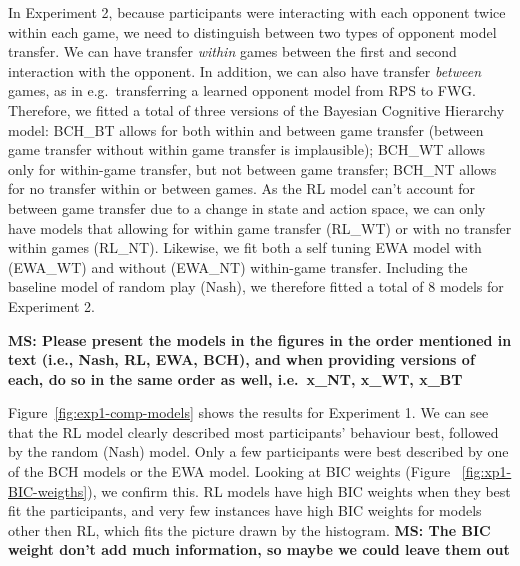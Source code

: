 \documentclass[
  english,
  man,floatsintext]{apa6}
\begin{document}
In Experiment 2, because participants were interacting with each opponent twice within each game, we need to distinguish between two types of opponent model transfer. We can have transfer \emph{within} games between the first and second interaction with the opponent. In addition, we can also have transfer \emph{between} games, as in e.g.~transferring a learned opponent model from RPS to FWG. Therefore, we fitted a total of three versions of the Bayesian Cognitive Hierarchy model: BCH\_BT allows for both within and between game transfer (between game transfer without within game transfer is implausible); BCH\_WT allows only for within-game transfer, but not between game transfer; BCH\_NT allows for no transfer within or between games. As the RL model can't account for between game transfer due to a change in state and action space, we can only have models that allowing for within game transfer (RL\_WT) or with no transfer within games (RL\_NT). Likewise, we fit both a self tuning EWA model with (EWA\_WT) and without (EWA\_NT) within-game transfer. Including the baseline model of random play (Nash), we therefore fitted a total of 8 models for Experiment 2.

\textbf{MS: Please present the models in the figures in the order mentioned in text (i.e., Nash, RL, EWA, BCH), and when providing versions of each, do so in the same order as well, i.e.~x\_NT, x\_WT, x\_BT}

Figure~\ref{fig:exp1-comp-models} shows the results for Experiment 1. We can see that the RL model clearly described most participants' behaviour best, followed by the random (Nash) model. Only a few participants were best described by one of the BCH models or the EWA model. Looking at BIC weights (Figure ~\ref{fig:xp1-BIC-weigths}), we confirm this. RL models have high BIC weights when they best fit the participants, and very few instances have high BIC weights for models other then RL, which fits the picture drawn by the histogram. \textbf{MS: The BIC weight don't add much information, so maybe we could leave them out }
\end{document}
